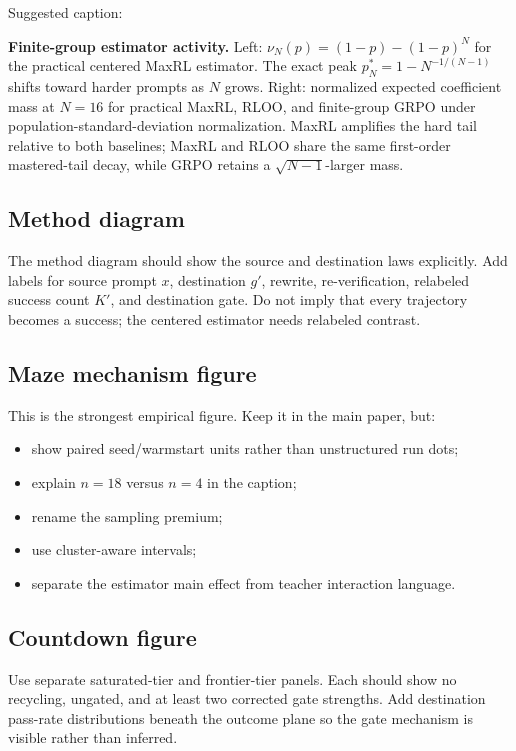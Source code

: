 \documentclass[11pt]{article}
\theoremstyle{definition}
\theoremstyle{remark}
\begin{document}
Suggested caption:

\begin{rewritebox}
\textbf{Finite-group estimator activity.} Left: $\nu_N(p)=(1-p)-(1-p)^N$ for the practical centered MaxRL estimator. The exact peak $p_N^*=1-N^{-1/(N-1)}$ shifts toward harder prompts as $N$ grows. Right: normalized expected coefficient mass at $N=16$ for practical MaxRL, RLOO, and finite-group GRPO under population-standard-deviation normalization. MaxRL amplifies the hard tail relative to both baselines; MaxRL and RLOO share the same first-order mastered-tail decay, while GRPO retains a $\sqrt{N-1}$-larger mass.
\end{rewritebox}

\subsection{Method diagram}

The method diagram should show the source and destination laws explicitly. Add labels for source prompt $x$, destination $g'$, rewrite, re-verification, relabeled success count $K'$, and destination gate. Do not imply that every trajectory becomes a success; the centered estimator needs relabeled contrast.

\subsection{Maze mechanism figure}

This is the strongest empirical figure. Keep it in the main paper, but:

\begin{itemize}[leftmargin=2em]
\item show paired seed/warmstart units rather than unstructured run dots;
\item explain $n=18$ versus $n=4$ in the caption;
\item rename the sampling premium;
\item use cluster-aware intervals;
\item separate the estimator main effect from teacher interaction language.
\end{itemize}

\subsection{Countdown figure}

Use separate saturated-tier and frontier-tier panels. Each should show no recycling, ungated, and at least two corrected gate strengths. Add destination pass-rate distributions beneath the outcome plane so the gate mechanism is visible rather than inferred.
\end{document}
